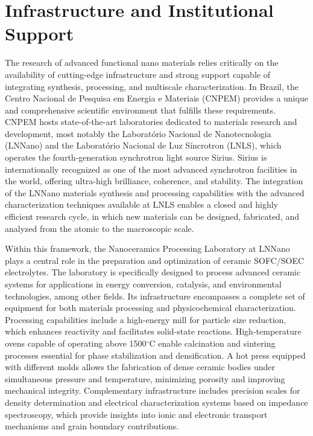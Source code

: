 \section{Infrastructure and Institutional Support}

The research of advanced functional nano materials relies critically on the availability of cutting-edge infrastructure and strong support capable of integrating synthesis, processing, and multiscale characterization. In Brazil, the Centro Nacional de Pesquisa em Energia e Materiais (CNPEM) provides a unique and comprehensive scientific environment that fulfills these requirements. CNPEM hosts state-of-the-art laboratories dedicated to materials research and development, most notably the Laboratório Nacional de Nanotecnologia (LNNano) and the Laboratório Nacional de Luz Síncrotron (LNLS), which operates the fourth-generation synchrotron light source Sirius. Sirius is internationally recognized as one of the most advanced synchrotron facilities in the world, offering ultra-high brilliance, coherence, and stability. The integration of the LNNano materials synthesis and processing capabilities with the advanced characterization techniques available at LNLS enables a closed and highly efficient research cycle, in which new materials can be designed, fabricated, and analyzed from the atomic to the macroscopic scale.

Within this framework, the Nanoceramics Processing Laboratory at LNNano plays a central role in the preparation and optimization of ceramic SOFC/SOEC electrolytes. The laboratory is specifically designed to process advanced ceramic systems for applications in energy conversion, catalysis, and environmental technologies, among other fields. Its infrastructure encompasses a complete set of equipment for both materials processing and physicochemical characterization. Processing capabilities include a high-energy mill for particle size reduction, which enhances reactivity and facilitates solid-state reactions. High-temperature ovens capable of operating above 1500$^\circ$C enable calcination and sintering processes essential for phase stabilization and densification. A hot press equipped with different molds allows the fabrication of dense ceramic bodies under simultaneous pressure and temperature, minimizing porosity and improving mechanical integrity. Complementary infrastructure includes precision scales for density determination and electrical characterization systems based on impedance spectroscopy, which provide insights into ionic and electronic transport mechanisms and grain boundary contributions.

